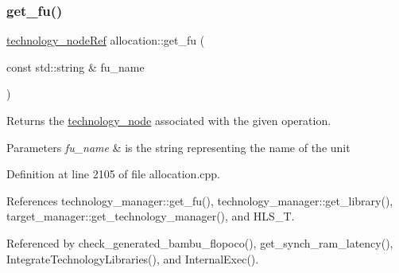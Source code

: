 \mbox{\label{classallocation_a15d6ddec8f9a3eb2f499481ef96525e0}} 
\subsubsection{\texorpdfstring{get\+\_\+fu()}{get\_fu()}}
{\footnotesize\ttfamily \hyperlink{technology__node_8hpp_a33dd193b7bd6b987bf0d8a770a819fa7}{technology\+\_\+node\+Ref} allocation\+::get\+\_\+fu (\begin{DoxyParamCaption}\item[{const std\+::string \&}]{fu\+\_\+name }\end{DoxyParamCaption})\hspace{0.3cm}{\ttfamily [protected]}}



Returns the \hyperlink{structtechnology__node}{technology\+\_\+node} associated with the given operation. 


\begin{DoxyParams}{Parameters}
{\em fu\+\_\+name} & is the string representing the name of the unit \\
\hline
\end{DoxyParams}


Definition at line 2105 of file allocation.\+cpp.



References technology\+\_\+manager\+::get\+\_\+fu(), technology\+\_\+manager\+::get\+\_\+library(), target\+\_\+manager\+::get\+\_\+technology\+\_\+manager(), and H\+L\+S\+\_\+T.



Referenced by check\+\_\+generated\+\_\+bambu\+\_\+flopoco(), get\+\_\+synch\+\_\+ram\+\_\+latency(), Integrate\+Technology\+Libraries(), and Internal\+Exec().

